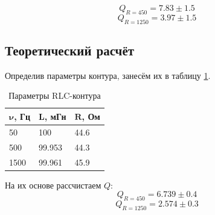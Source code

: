 \documentclass{lab}
\begin{document}
\begin{equation}
    Q_{R=450} = 7.83 \pm 1.5
\end{equation}
\begin{equation}
    Q_{R=1250} = 3.97 \pm 1.5
\end{equation}

\subsection{Теоретический расчёт}

Определив параметры контура, занесём их в таблицу \ref{2}.

\begin{table}[h!]
    \centering
    \begin{tabular}{|l|l|l|}
        \hline
        $\mathbf{\nu}${\bf,  Гц} & $\mathbf{L}${\bf, мГн} & $\mathbf{R}${\bf, Ом} \\ \hline
        50                       & 100                    & 44.6                \\ \hline
        500                      & 99.953                 & 44.3                \\ \hline
        1500                     & 99.961                 & 45.9                \\ \hline
    \end{tabular}
    \caption{Параметры RLC-контура}
    \label{2}
\end{table}

На их основе рассчистаем $Q$:
\begin{equation}
    Q_{R=450} = 6.739 \pm 0.4
\end{equation}
\begin{equation}
    Q_{R=1250}= 2.574 \pm 0.3
\end{equation}
\end{document}
